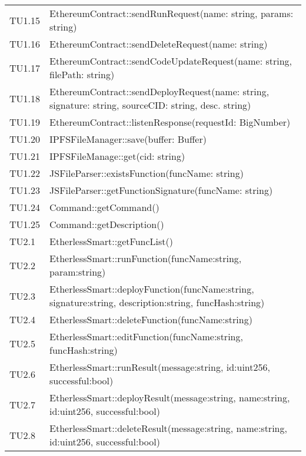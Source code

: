 \begin{longtable}{
		>{\centering}p{}
		>{\centering\arraybackslash}p{}}
	TU1.15 & EthereumContract::sendRunRequest(name: string, params: string) \\

	TU1.16 & EthereumContract::sendDeleteRequest(name: string) \\

	TU1.17 & EthereumContract::sendCodeUpdateRequest(name: string, filePath: string) \\

	TU1.18 & EthereumContract::sendDeployRequest(name: string, signature: string, sourceCID: string, desc. string) \\

	TU1.19 & EthereumContract::listenResponse(requestId: BigNumber) \\

	TU1.20 & IPFSFileManager::save(buffer: Buffer) \\

	TU1.21 & IPFSFileManage::get(cid: string) \\

	TU1.22 & JSFileParser::existsFunction(funcName: string) \\

	TU1.23 & JSFileParser::getFunctionSignature(funcName: string) \\

	TU1.24 & Command::getCommand() \\

	TU1.25 & Command::getDescription() \\
	
	TU2.1  &  EtherlessSmart::getFuncList()  \tabularnewline
	
	TU2.2  &  EtherlessSmart::runFunction(funcName:string, param:string)  \tabularnewline
	
	TU2.3  &  EtherlessSmart::deployFunction(funcName:string, signature:string, description:string, funcHash:string)  \tabularnewline
	
	TU2.4  &  EtherlessSmart::deleteFunction(funcName:string)  \tabularnewline
	
	TU2.5  &  EtherlessSmart::editFunction(funcName:string, funcHash:string)  \tabularnewline
	
	TU2.6  &  EtherlessSmart::runResult(message:string, id:uint256, successful:bool)  \tabularnewline
	
	TU2.7  &  EtherlessSmart::deployResult(message:string, name:string, id:uint256, successful:bool)  \tabularnewline
	
	TU2.8  &  EtherlessSmart::deleteResult(message:string, name:string, id:uint256, successful:bool)  \tabularnewline
	

\end{longtable}
